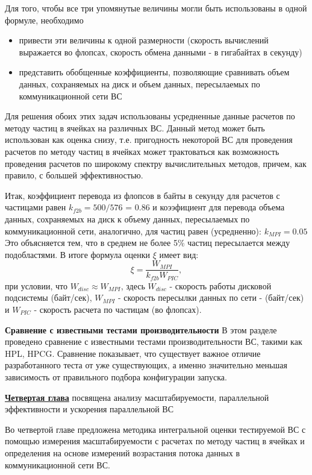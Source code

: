 Для того, чтобы все три упомянутые величины могли быть использованы в одной формуле, необходимо 
\begin{itemize}
	\item привести эти величины к одной размерности (скорость вычислений выражается во флопсах, скорость обмена данными - в гигабайтах в секунду)
	\item представить обобщенные коэффициенты, позволяющие сравнивать объем данных, сохраняемых на диск и объем данных, пересылаемых по коммуникационной сети ВС  
\end{itemize}

Для решения обоих этих задач использованы усредненные данные расчетов по методу частиц в ячейках на различных ВС. Данный метод может быть использован как оценка снизу, т.е. пригодность некоторой ВС для проведения расчетов по методу частиц в ячейках может трактоваться как возможность проведения расчетов по широкому спектру вычислительных методов, причем, как правило, с большей эффективностью.

Итак, коэффициент перевода из флопсов в байты в секунду для расчетов с частицами равен
$k_{f2b} = 500/576$ = 0.86   
и коээфициент для перевода объема данных, сохраняемых на диск к объему данных, пересылаемых по коммуникационной сети, аналогично, для частиц равен (усредненно):
$k_{MPI} = 0.05$ 
Это объясняется тем, что в среднем не более 5\% частиц пересылается между подобластями.
В итоге формула оценки $\xi$ имеет вид:
$$
\xi = \frac{W_{MPI}} {k_{f2b} W_{PIC}}, 
$$
при условии, что $W_{disc} \approx W_{MPI}$,
здесь $W_{disc}$ - скорость работы дисковой подсистемы (байт/сек), $W_{MPI}$
- скорость пересылки данных по сети - (байт/сек) и $W_{PIC}$ - скорость расчета по частицам (во флопсах).	

\textbf{Сравнение с известными тестами производительности}
В этом разделе проведено сравнение с известными тестами производительности ВС, такими как HPL, HPCG. Сравнение показывает, что существует важное отличие разработанного теста от уже существующих, а именно значительно меньшая зависимость от правильного подбора конфигурации запуска. 


\underline{\textbf{Четвертая глава}} посвящена  
анализу масштабируемости, параллельной эффективности и ускорения параллельной ВС

Во четвертой главе предложена методика интегральной оценки тестируемой ВС с помощью измерения масштабируемости с расчетах по методу частиц в ячейках и определения на основе измерений возрастания потока данных в коммуникационной сети ВС.

